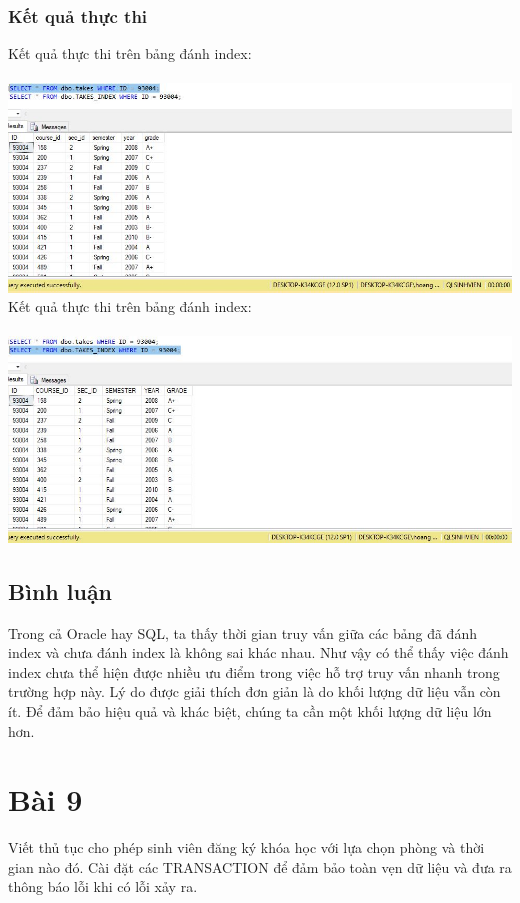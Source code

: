 \documentclass[12pt,a4paper]{report}
\begin{document}
\subsubsection{Kết quả thực thi}
Kết quả thực thi trên bảng đánh index:\\\\
\includegraphics[scale=.62]{kb8s1}\\
Kết quả thực thi trên bảng đánh index:\\\\
\includegraphics[scale=.62]{kb8s2}
\subsection{Bình luận}
Trong cả Oracle hay SQL, ta thấy thời gian truy vấn giữa các bảng đã đánh index và chưa đánh index là không sai khác nhau. Như vậy có thể thấy việc đánh index chưa thể hiện được nhiều ưu điểm trong việc hỗ trợ truy vấn nhanh trong trường hợp này. Lý do được giải thích đơn giản là do khối lượng dữ liệu vẫn còn ít. Để đảm bảo hiệu quả và khác biệt, chúng ta cần một khối lượng dữ liệu lớn hơn.
\section{Bài 9}
\begin{boxedminipage}[t]{15.5cm}
Viết thủ tục cho phép sinh viên đăng ký khóa học với lựa chọn phòng và thời gian nào
đó. Cài đặt các TRANSACTION để đảm bảo toàn vẹn dữ liệu và đưa ra thông báo lỗi khi có
lỗi xảy ra.	
\end{boxedminipage}
\end{document}
